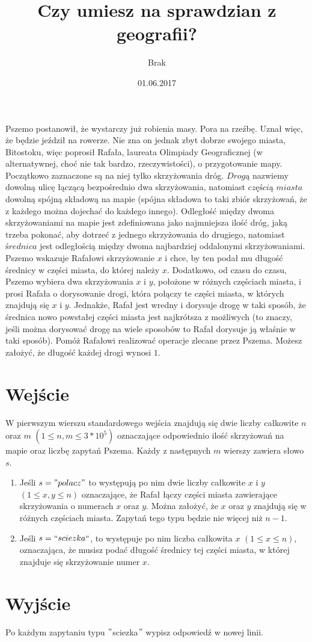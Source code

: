 \documentclass[zad,zawodnik,utf8]{sinol}
\title{Czy umiesz na sprawdzian z geografii?}
\author{Brak} %
\date{01.06.2017}
\begin{document}
\begin{tasktext}

	Pszemo postanowił, że wystarczy już robienia masy. Pora na rzeźbę. Uznał więc, że będzie jeździł na rowerze. Nie zna on jednak zbyt dobrze swojego miasta, Bitostoku, więc poprosił Rafała, laureata Olimpiady Geograficznej (w alternatywnej, choć nie tak bardzo, rzeczywistości), o przygotowanie mapy. Początkowo zaznaczone są na niej tylko skrzyżowania dróg. $Drogą$ nazwiemy dowolną ulicę łączącą bezpośrednio dwa skrzyżowania, natomiast $częścią$ $miasta$ dowolną spójną składową na mapie (spójna składowa to taki zbiór skrzyżowań, że z każdego można dojechać do każdego innego). Odległość między dwoma skrzyżowaniami na mapie jest zdefiniowana jako najmniejsza ilość dróg, jaką trzeba pokonać, aby dotrzeć z jednego skrzyżowania do drugiego, natomiast $średnica$ jest odległością między dwoma najbardziej oddalonymi skrzyżowaniami. Pszemo wskazuje Rafałowi skrzyżowanie $x$ i chce, by ten podał mu długość średnicy w części miasta, do której należy $x$. Dodatkowo, od czasu do czasu, Pszemo wybiera dwa skrzyżowania $x$ i $y$, położone w różnych częściach miasta, i prosi Rafała o dorysowanie drogi, która połączy te części miasta, w których znajdują się $x$ i $y$. Jednakże, Rafał jest wredny i dorysuje drogę w taki sposób, że średnica nowo powstałej części miasta jest najkrótsza z możliwych (to znaczy, jeśli można dorysować drogę na wiele sposobów to Rafał dorysuje ją właśnie w taki sposób). Pomóż Rafałowi realizować operacje zlecane przez Pszema. Możesz założyć, że długość każdej drogi wynosi $1$.

  \section{Wejście}

	W pierwszym wierszu standardowego wejścia znajdują się dwie liczby całkowite $n$ oraz $m$ $(1 \leq n, m \leq 3*10^5)$ oznaczające odpowiednio ilość skrzyżowań na mapie oraz
liczbę zapytań Pszema. Każdy z następnych $m$ wierszy zawiera słowo $s$.
\begin{enumerate}
	\item Jeśli $s = "polacz"$ to występują po nim dwie liczby całkowite $x$ i $y$ $(1 \leq x, y \leq n)$ oznaczające, że Rafał łączy części miasta zawierające skrzyżowania o numerach $x$ oraz $y$. Można założyć, że $x$ oraz $y$ znajdują się w różnych częściach miasta. Zapytań tego typu będzie nie więcej niż $n - 1$.
	\item Jeśli $s = ``sciezka``$, to występuje po nim liczba całkowita $x$ $(1 \leq x \leq n)$, oznaczająca, że musisz podać długość średnicy tej części miasta, w której znajduje się skrzyżowanie numer $x$.
\end{enumerate}

	\section{Wyjście}
	
	Po każdym zapytaniu typu $"$sciezka$"$ wypisz odpowiedź w nowej linii.



\end{tasktext}
\end{document}

